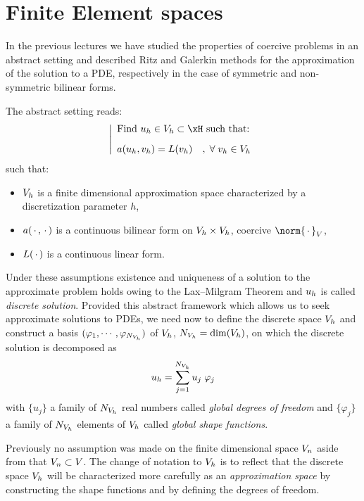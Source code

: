 
\chapter{Finite Element spaces}\label{sec:fem}

In the previous lectures we have studied the properties of coercive problems in an abstract setting and described Ritz and Galerkin methods for the approximation of the solution to a PDE, respectively in the case of symmetric and non-symmetric bilinear forms.

\medskip
The abstract setting reads:
\begin{equation*}
\left\lvert
\begin{array}{l}
\mbox{Find $\uh\in\xVh\subset \xH$ such that:}\\[2ex]
a(\uh,\vh) = L(\vh)\quad,\;\forany  \vh \in \xVh
\end{array}
\right.
\end{equation*}
such that:
\begin{itemize}
\item ${{V}}_h$ is a finite dimensional approximation space characterized by a discretization parameter $h$,
\item $a(\,{\mathbf\cdot}\,,\,{\mathbf\cdot}\,)$ is a continuous bilinear form on ${{V}}_h\times{{V}}_h$, coercive \wrt $\norm{\xDot}_{\xV}$,
\item $L(\,{\mathbf\cdot}\,)$ is a continuous linear form.
\end{itemize}

Under these assumptions existence and uniqueness of a solution to the approximate problem holds owing to the Lax--Milgram Theorem and ${u_h}$ is called \textit{discrete solution}.
Provided this abstract framework which allows us to seek approximate solutions to PDEs, we need now to define the discrete space ${{V}}_h$ and construct a basis $(\varphi_1,\cdots,\varphi_{{N_{{{V}}_h}}})$ of ${{V}}_h$, ${N_{{{V}}_h}} = \dim({{V}}_h)$, on which the discrete solution is decomposed as
\begin{equation*}
{u_h} = \sum_{j=1}^{{N_{{{V}}_h}}} u_j\; \varphi_j
\end{equation*}
with $\lbrace u_j \rbrace$ a family of ${N_{{{V}}_h}}$ real numbers called \textit{global degrees of freedom} and $\lbrace \varphi_j \rbrace$ a family of ${N_{{{V}}_h}}$ elements of ${{V}}_h$ called \textit{global shape functions}.

\medskip
Previously no assumption was made on the finite dimensional space ${V}_n$ aside from that ${V}_n \subset {V}$.
The change of notation to ${V}_h$ is to reflect that the discrete space ${V}_h$ will be characterized more carefully as an \textit{approximation space} by constructing the shape functions and by defining the degrees of freedom.

